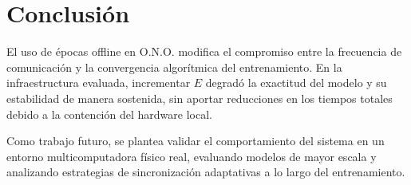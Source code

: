
\section{Conclusión}

El uso de épocas offline en O.N.O. modifica el compromiso entre la frecuencia de comunicación y la convergencia algorítmica del entrenamiento. En la infraestructura evaluada, incrementar $E$ degradó la exactitud del modelo y su estabilidad de manera sostenida, sin aportar reducciones en los tiempos totales debido a la contención del hardware local.

Como trabajo futuro, se plantea validar el comportamiento del sistema en un entorno multicomputadora físico real, evaluando modelos de mayor escala y analizando estrategias de sincronización adaptativas a lo largo del entrenamiento.
